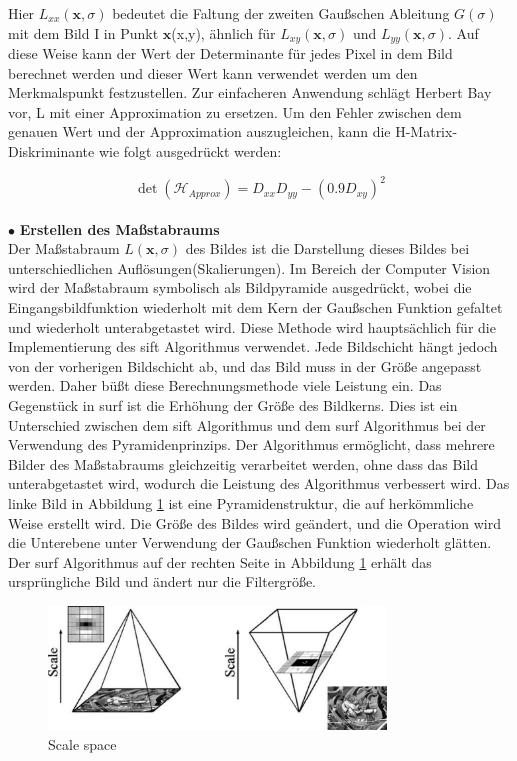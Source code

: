 Hier $L_{xx}(\textbf{x},\sigma)$ bedeutet die Faltung der zweiten Gaußschen Ableitung $G(\sigma)$ mit dem Bild I in Punkt $\textbf{x}$(x,y), ähnlich für $L_{xy}(\textbf{x},\sigma)$ und $L_{yy}(\textbf{x},\sigma)$. Auf diese Weise kann der Wert der Determinante für jedes Pixel in dem Bild berechnet werden und dieser Wert kann verwendet werden um den Merkmalspunkt festzustellen.
Zur einfacheren Anwendung schlägt Herbert Bay\cite{Surf} vor, L mit einer Approximation zu ersetzen. Um den Fehler zwischen dem genauen Wert und der Approximation auszugleichen, kann die H-Matrix-Diskriminante wie folgt ausgedrückt werden:

\begin{equation}
   \det(\mathcal{H}_{Approx}) = D_{xx}D_{yy} - (0.9D_{xy})^2  
\end{equation}
\\
$\bullet$ \textbf{Erstellen des Maßstabraums}\\
Der Maßstabraum $L(\textbf{x},\sigma)$ des Bildes ist die Darstellung dieses Bildes bei unterschiedlichen Auflösungen(Skalierungen). Im Bereich der Computer Vision wird der Maßstabraum symbolisch als Bildpyramide ausgedrückt, wobei die Eingangsbildfunktion wiederholt mit dem Kern der Gaußschen Funktion gefaltet und wiederholt unterabgetastet wird. Diese Methode wird hauptsächlich für die Implementierung des \gls{sift} Algorithmus verwendet. Jede Bildschicht hängt jedoch von der vorherigen Bildschicht ab, und das Bild muss in der Größe angepasst werden. Daher büßt diese Berechnungsmethode viele Leistung ein. Das Gegenstück in \gls{surf} ist die Erhöhung der Größe des Bildkerns. Dies ist ein Unterschied zwischen dem \gls{sift} Algorithmus und dem \gls{surf} Algorithmus bei der Verwendung des Pyramidenprinzips.
Der Algorithmus ermöglicht, dass mehrere Bilder des Maßstabraums gleichzeitig verarbeitet werden, ohne dass das Bild unterabgetastet wird, wodurch die Leistung des Algorithmus verbessert wird. Das linke Bild in Abbildung \ref{fig:Scale space} ist eine Pyramidenstruktur, die auf herkömmliche Weise erstellt wird. Die Größe des Bildes wird geändert, und die Operation wird die Unterebene  unter Verwendung der Gaußschen Funktion wiederholt glätten. Der \gls{surf} Algorithmus auf der rechten Seite in Abbildung \ref{fig:Scale space} erhält das ursprüngliche Bild und ändert nur die Filtergröße.

\begin{figure}[htb]
 \centering 
 \includegraphics[keepaspectratio,width=0.8\textwidth]{images/3_Ersteverfahren/Scale_space.pdf}
 \caption{Scale space}
 \label{fig:Scale space}
\end{figure} 


